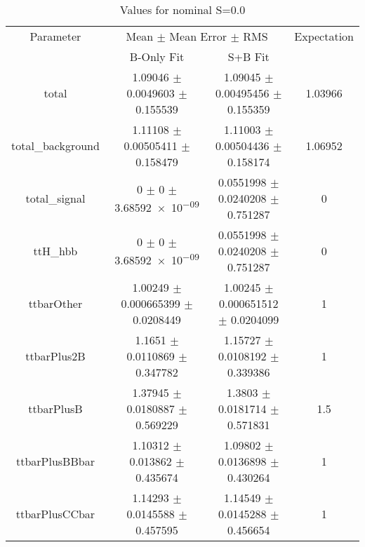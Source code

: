 \begin{table}
\centering
\caption{Values for nominal S=0.0}
\begin{tabular}{cccc}
\toprule
Parameter & \multicolumn{2}{c}{Mean $\pm$ Mean Error $\pm$ RMS} & Expectation\\
 & B-Only Fit & S+B Fit & \\
\midrule
total & \num{1.09046} $\pm$ \num{0.0049603} $\pm$ \num{0.155539} & \num{1.09045} $\pm$ \num{0.00495456} $\pm$ \num{0.155359} & \num{1.03966}\\
total\_background & \num{1.11108} $\pm$ \num{0.00505411} $\pm$ \num{0.158479} & \num{1.11003} $\pm$ \num{0.00504436} $\pm$ \num{0.158174} & \num{1.06952}\\
total\_signal & \num{0} $\pm$ \num{0} $\pm$ \num{3.68592e-09} & \num{0.0551998} $\pm$ \num{0.0240208} $\pm$ \num{0.751287} & \num{0}\\
ttH\_hbb & \num{0} $\pm$ \num{0} $\pm$ \num{3.68592e-09} & \num{0.0551998} $\pm$ \num{0.0240208} $\pm$ \num{0.751287} & \num{0}\\
ttbarOther & \num{1.00249} $\pm$ \num{0.000665399} $\pm$ \num{0.0208449} & \num{1.00245} $\pm$ \num{0.000651512} $\pm$ \num{0.0204099} & \num{1}\\
ttbarPlus2B & \num{1.1651} $\pm$ \num{0.0110869} $\pm$ \num{0.347782} & \num{1.15727} $\pm$ \num{0.0108192} $\pm$ \num{0.339386} & \num{1}\\
ttbarPlusB & \num{1.37945} $\pm$ \num{0.0180887} $\pm$ \num{0.569229} & \num{1.3803} $\pm$ \num{0.0181714} $\pm$ \num{0.571831} & \num{1.5}\\
ttbarPlusBBbar & \num{1.10312} $\pm$ \num{0.013862} $\pm$ \num{0.435674} & \num{1.09802} $\pm$ \num{0.0136898} $\pm$ \num{0.430264} & \num{1}\\
ttbarPlusCCbar & \num{1.14293} $\pm$ \num{0.0145588} $\pm$ \num{0.457595} & \num{1.14549} $\pm$ \num{0.0145288} $\pm$ \num{0.456654} & \num{1}\\
\bottomrule
\end{tabular}
\end{table}